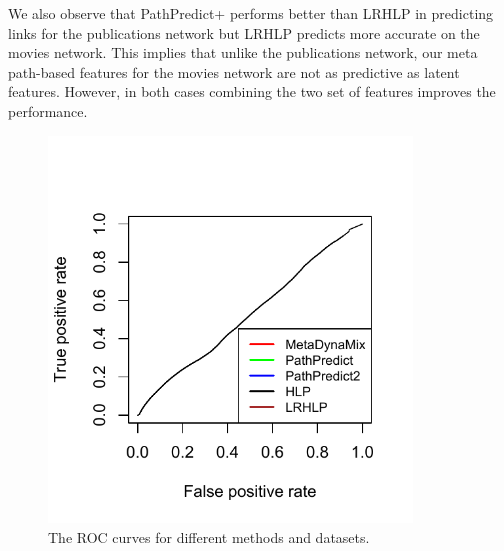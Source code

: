 We also observe that PathPredict+ performs better than LRHLP in predicting links for the publications network but LRHLP predicts more accurate on the movies network. This implies that unlike the publications network, our meta path-based features for the movies network are not as predictive as latent features. However, in both cases combining the two set of features improves the performance.




\begin{figure}[t]
\centering
\includegraphics[trim = 0mm 10mm 0mm 0mm,width=0.86\textwidth]{figs/ROC.pdf}
\caption{The ROC curves for different methods and datasets.} \label{fig:auc}
\end{figure}




